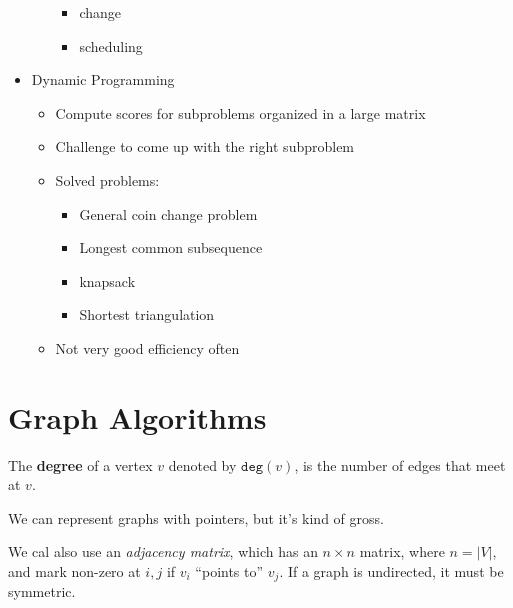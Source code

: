 \documentclass[12pt]{article}
\begin{document}
\begin{itemize}
\begin{itemize}
\begin{itemize}
					\item change
					\item scheduling
				\end{itemize}
		\end{itemize}
	\item Dynamic Programming
		\begin{itemize}
			\item Compute scores for subproblems organized in a large matrix
			\item Challenge to come up with the right subproblem
			\item Solved problems:
				\begin{itemize}
					\item General coin change problem
					\item Longest common subsequence
					\item knapsack
					\item Shortest triangulation
				\end{itemize}
			\item Not very good efficiency often
		\end{itemize}
\end{itemize}

\section{Graph Algorithms}

The \textbf{degree} of a vertex $v$ denoted by $\texttt{deg}(v)$, is the number
of edges that meet at $v$.

We can represent graphs with pointers, but it's kind of gross.

We cal also use an \emph{adjacency matrix}, which has an $n\times n$ matrix,
where $n=|V|$, and mark non-zero at $i,j$ if $v_i$ ``points to'' $v_j$. If a
graph is undirected, it must be symmetric.
\end{document}
